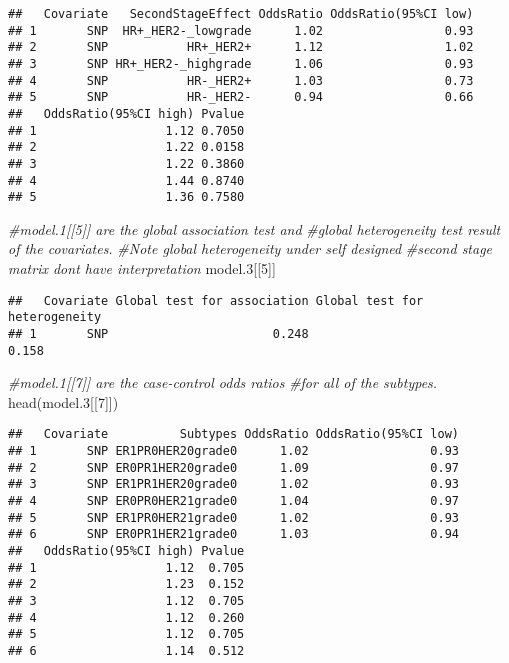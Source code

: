 \documentclass[11pt,]{article}
\newenvironment{Shaded}{\begin{snugshade}}{\end{snugshade}}
\newcommand{\CommentTok}[1]{\textcolor[rgb]{0.56,0.35,0.01}{\textit{#1}}}
\newcommand{\DecValTok}[1]{\textcolor[rgb]{0.00,0.00,0.81}{#1}}
\newcommand{\FloatTok}[1]{\textcolor[rgb]{0.00,0.00,0.81}{#1}}
\newcommand{\FunctionTok}[1]{\textcolor[rgb]{0.00,0.00,0.00}{#1}}
\newcommand{\NormalTok}[1]{#1}
\begin{document}
\begin{verbatim}
##   Covariate   SecondStageEffect OddsRatio OddsRatio(95%CI low)
## 1       SNP  HR+_HER2-_lowgrade      1.02                 0.93
## 2       SNP           HR+_HER2+      1.12                 1.02
## 3       SNP HR+_HER2-_highgrade      1.06                 0.93
## 4       SNP           HR-_HER2+      1.03                 0.73
## 5       SNP           HR-_HER2-      0.94                 0.66
##   OddsRatio(95%CI high) Pvalue
## 1                  1.12 0.7050
## 2                  1.22 0.0158
## 3                  1.22 0.3860
## 4                  1.44 0.8740
## 5                  1.36 0.7580
\end{verbatim}

\begin{Shaded}
\begin{Highlighting}[]
\CommentTok{\#model.1[[5]] are the global association test and }
\CommentTok{\#global heterogeneity test result of the covariates.}
\CommentTok{\#Note global heterogeneity under self designed}
\CommentTok{\#second stage matrix don\textquotesingle{}t have interpretation}
\NormalTok{model}\FloatTok{.3}\NormalTok{[[}\DecValTok{5}\NormalTok{]]}
\end{Highlighting}
\end{Shaded}

\begin{verbatim}
##   Covariate Global test for association Global test for heterogeneity
## 1       SNP                       0.248                         0.158
\end{verbatim}

\begin{Shaded}
\begin{Highlighting}[]
\CommentTok{\#model.1[[7]] are the case{-}control odds ratios }
\CommentTok{\#for all of the subtypes.}
\FunctionTok{head}\NormalTok{(model}\FloatTok{.3}\NormalTok{[[}\DecValTok{7}\NormalTok{]])}
\end{Highlighting}
\end{Shaded}

\begin{verbatim}
##   Covariate          Subtypes OddsRatio OddsRatio(95%CI low)
## 1       SNP ER1PR0HER20grade0      1.02                 0.93
## 2       SNP ER0PR1HER20grade0      1.09                 0.97
## 3       SNP ER1PR1HER20grade0      1.02                 0.93
## 4       SNP ER0PR0HER21grade0      1.04                 0.97
## 5       SNP ER1PR0HER21grade0      1.02                 0.93
## 6       SNP ER0PR1HER21grade0      1.03                 0.94
##   OddsRatio(95%CI high) Pvalue
## 1                  1.12  0.705
## 2                  1.23  0.152
## 3                  1.12  0.705
## 4                  1.12  0.260
## 5                  1.12  0.705
## 6                  1.14  0.512
\end{verbatim}
\end{document}

